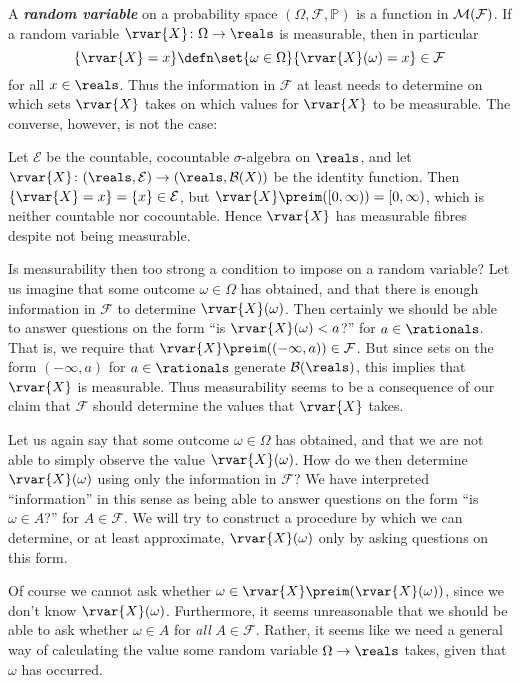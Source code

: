 \documentclass[article, a4paper, 11pt, oneside]{memoir}
\numberwithin{equation}{chapter}
\newcommand{\calB}{\mathcal{B}}
\newcommand{\calE}{\mathcal{E}}
\newcommand{\calF}{\mathcal{F}}
\newcommand{\borel}[1]{\calB(#1)}
\renewcommand{\P}{\mathbb{P}}
\newcommand{\keyword}[1]{{\itshape\bfseries #1}}
\begin{document}
A \keyword{random variable} on a probability space $(\Omega,\calF,\P)$ is a function in $\meas{\calF}$. If a random variable $\rvar{X} \colon \Omega \to \reals$ is measurable, then in particular
%
\begin{equation*}
    \{ \rvar{X} = x \}
        \defn \set{\omega \in \Omega}{\rvar{X}(\omega) = x}
        \in \calF
\end{equation*}
%
for all $x \in \reals$. Thus the information in $\calF$ at least needs to determine on which sets $\rvar{X}$ takes on which values for $\rvar{X}$ to be measurable. The converse, however, is not the case:
%
\begin{example}
    Let $\calE$ be the countable, cocountable $\sigma$-algebra on $\reals$, and let $\rvar{X} \colon (\reals, \calE) \to (\reals, \borel{X})$ be the identity function. Then $\{\rvar{X} = x\} = \{x\} \in \calE$, but $\rvar{X}\preim([0,\infty)) = [0,\infty)$, which is neither countable nor cocountable. Hence $\rvar{X}$ has measurable fibres despite not being measurable.
\end{example}
%
Is measurability then too strong a condition to impose on a random variable? Let us imagine that some outcome $\omega \in \Omega$ has obtained, and that there is enough information in $\calF$ to determine $\rvar{X}(\omega)$. Then certainly we should be able to answer questions on the form \enquote{is $\rvar{X}(\omega) < a$?} for $a \in \rationals$. That is, we require that $\rvar{X}\preim((-\infty,a)) \in \calF$. But since sets on the form $(-\infty,a)$ for $a \in \rationals$ generate $\borel{\reals}$, this implies that $\rvar{X}$ is measurable. Thus measurability seems to be a consequence of our claim that $\calF$ should determine the values that $\rvar{X}$ takes.

Let us again say that some outcome $\omega \in \Omega$ has obtained, and that we are not able to simply observe the value $\rvar{X}(\omega)$. How do we then determine $\rvar{X}(\omega)$ using only the information in $\calF$? We have interpreted \enquote{information} in this sense as being able to answer questions on the form \enquote{is $\omega \in A$?} for $A \in \calF$. We will try to construct a procedure by which we can determine, or at least approximate, $\rvar{X}(\omega)$ only by asking questions on this form.

Of course we cannot ask whether $\omega \in \rvar{X}\preim(\rvar{X}(\omega))$, since we don't know $\rvar{X}(\omega)$. Furthermore, it seems unreasonable that we should be able to ask whether $\omega \in A$ for \emph{all} $A \in \calF$. Rather, it seems like we need a general way of calculating the value some random variable $\Omega \to \reals$ takes, given that $\omega$ has occurred.
\end{document}
